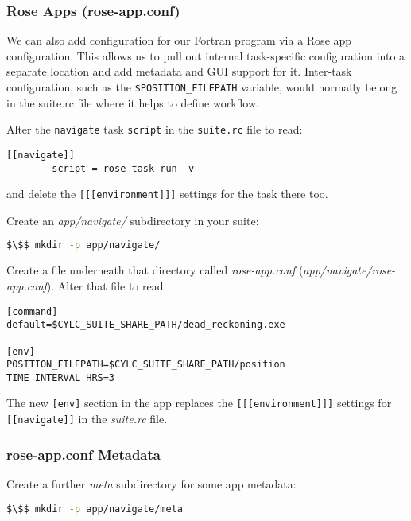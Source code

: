 \subsubsection{Rose Apps (rose-app.conf)}

We can also add configuration for our Fortran program via a Rose app configuration. This allows us to pull out internal task-specific configuration into a separate location and add metadata and GUI support for it. Inter-task configuration, such as the \lstinline{$POSITION_FILEPATH} variable, would normally belong in the suite.rc file where it helps to define workflow.

Alter the \lstinline{navigate} task \lstinline{script} in the \lstinline{suite.rc} file to read:
\lstset{language=suiterc}
\begin{lstlisting}[columns=fullflexible]
    [[navigate]]
        script = rose task-run -v
\end{lstlisting}

and delete the \lstinline{[[[environment]]]} settings for the task there too.

Create an {\em app/navigate/} subdirectory in your suite:

\begin{lstlisting}[mathescape, language=bash]
$\$$ mkdir -p app/navigate/
\end{lstlisting}

Create a file underneath that directory called {\em rose-app.conf} ({\em app/navigate/rose-app.conf}). Alter that file to read:

\lstset{language=suiterc}
\begin{lstlisting}[columns=fullflexible]
[command]
default=$CYLC_SUITE_SHARE_PATH/dead_reckoning.exe

[env]
POSITION_FILEPATH=$CYLC_SUITE_SHARE_PATH/position
TIME_INTERVAL_HRS=3
\end{lstlisting}

The new \lstinline{[env]} section in the app replaces the \lstinline{[[[environment]]]} settings for \lstinline{[[navigate]]} in the {\em suite.rc} file.

\subsubsection{rose-app.conf Metadata}

Create a further {\em meta} subdirectory for some app metadata:

\begin{lstlisting}[mathescape, language=bash]
$\$$ mkdir -p app/navigate/meta
\end{lstlisting}

